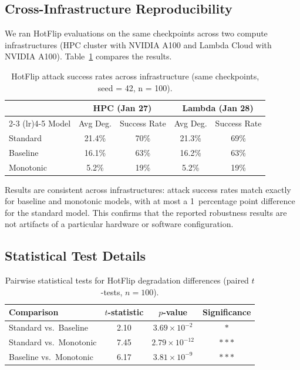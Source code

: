 \documentclass{article}
\begin{document}
\subsection{Cross-Infrastructure Reproducibility}

We ran HotFlip evaluations on the same checkpoints across two compute infrastructures (HPC cluster with NVIDIA A100 and Lambda Cloud with NVIDIA A100). Table~\ref{tab:cross-infra} compares the results.

\begin{table}[h]
\caption{HotFlip attack success rates across infrastructure (same checkpoints, seed = 42, n = 100).}
\label{tab:cross-infra}
\centering
\begin{tabular}{lcccc}
\toprule
& \multicolumn{2}{c}{HPC (Jan 27)} & \multicolumn{2}{c}{Lambda (Jan 28)} \\
\cmidrule(lr){2-3} \cmidrule(lr){4-5}
Model & Avg Deg. & Success Rate & Avg Deg. & Success Rate \\
\midrule
Standard  & 21.4\% & 70\% & 21.3\% & 69\% \\
Baseline  & 16.1\% & 63\% & 16.2\% & 63\% \\
Monotonic &  5.2\% & 19\% &  5.2\% & 19\% \\
\bottomrule
\end{tabular}
\end{table}

Results are consistent across infrastructures: attack success rates match exactly for baseline and monotonic models, with at most a 1~percentage point difference for the standard model. This confirms that the reported robustness results are not artifacts of a particular hardware or software configuration.


\subsection{Statistical Test Details}

\begin{table}[h]
\caption{Pairwise statistical tests for HotFlip degradation differences (paired $t$-tests, $n = 100$).}
\label{tab:statistical-tests}
\centering
\begin{tabular}{lccc}
\toprule
Comparison & $t$-statistic & $p$-value & Significance \\
\midrule
Standard vs.\ Baseline  & 2.10 & $3.69 \times 10^{-2}$ & $*$ \\
Standard vs.\ Monotonic & 7.45 & $2.79 \times 10^{-12}$ & $***$ \\
Baseline vs.\ Monotonic & 6.17 & $3.81 \times 10^{-9}$ & $***$ \\
\bottomrule
\end{tabular}
\end{table}
\end{document}
